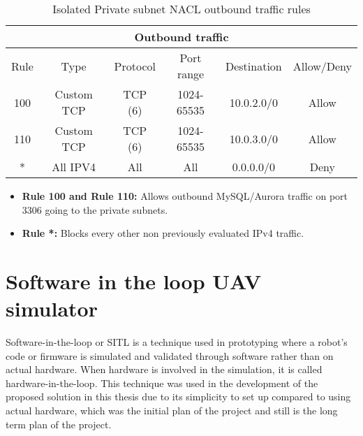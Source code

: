 \begin{table}[H]
    \centering
    \begin{tabular}{|c|c|c|c|c|c|}
        \hline
        \multicolumn{6}{|c|}{Outbound traffic}                               \\
        \hline
        Rule & Type       & Protocol & Port range & Destination & Allow/Deny \\
        \hline
        100  & Custom TCP & TCP (6)  & 1024-65535 & 10.0.2.0/0  & Allow      \\
        \hline
        110  & Custom TCP & TCP (6)  & 1024-65535 & 10.0.3.0/0  & Allow      \\
        \hline
        *    & All IPV4   & All      & All        & 0.0.0.0/0   & Deny       \\
        \hline
    \end{tabular}
    \caption{Isolated Private subnet NACL outbound traffic rules}
    \label{table:isolated-private-subnet-outbound}
\end{table}

\begin{itemize}
    \item \textbf{Rule 100 and Rule 110:} Allows outbound MySQL/Aurora traffic on port 3306 going to the private subnets.
    \item \textbf{Rule *:} Blocks every other non previously evaluated IPv4 traffic.
\end{itemize}




\section{Software in the loop UAV simulator}
\label{sec:software-in-the-loop}

Software-in-the-loop or SITL is a technique used in prototyping where a robot's code or firmware is simulated and validated through software rather than on actual hardware. When hardware is involved in the simulation, it is called hardware-in-the-loop. This technique was used in the development of the proposed solution in this thesis due to its simplicity to set up compared to using actual hardware, which was the initial plan of the project and still is the long term plan of the project.

